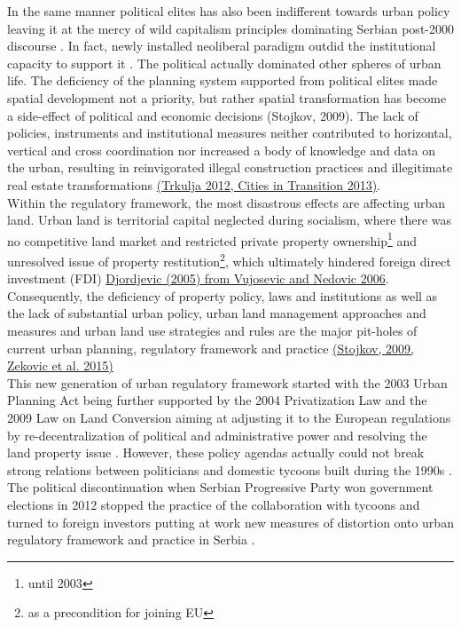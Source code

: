 \documentclass[11pt]{report}
\begin{document}
In the same manner political elites has also been indifferent towards urban policy leaving it at the mercy of wild capitalism principles dominating Serbian post-2000 discourse \href{}{\citealt{vujovic_belgrades_2007}}.
In fact, newly installed neoliberal paradigm outdid the institutional capacity to support it \cite{Peric 2016}.
The political actually dominated other spheres of urban life. The deficiency of the planning system supported from political elites made spatial development not a priority, but rather spatial transformation has become a side-effect of political and economic decisions (Stojkov, 2009). 
The lack of policies, instruments and institutional measures neither contributed to horizontal, vertical and cross coordination nor increased a body of knowledge and data on the urban, resulting in reinvigorated illegal construction practices and illegitimate real estate transformations \href{}{(Trkulja 2012, Cities in Transition 2013)}.
\\

Within the regulatory framework, the most disastrous effects are affecting urban land. Urban land is territorial capital neglected during socialism, where there was no competitive land market and restricted private property ownership\footnote{until 2003} and unresolved issue of property restitution\footnote{as a precondition for joining EU}, which ultimately hindered foreign direct investment (FDI) \href{}{Djordjevic (2005) from Vujosevic and Nedovic 2006}.  
Consequently, the deficiency of property policy, laws and institutions as well as the lack of substantial urban policy, urban land management approaches and measures and urban land use strategies and rules are the major pit-holes of current urban planning, regulatory framework and practice \href{}{(Stojkov, 2009, Zekovic et al. 2015)} 
\\

This new generation of urban regulatory framework started with the 2003 Urban Planning Act being further supported by the 2004 Privatization Law and the 2009 Law on Land Conversion aiming at adjusting it to the European regulations by re-decentralization of political and administrative power and resolving the land property issue \cite{Cagic 2014}. However, these policy agendas actually could not break strong relations between politicians and domestic tycoons built during the 1990s \href{}{\citealt{peric_evolution_2016}}.
The political discontinuation when Serbian Progressive Party won government elections in 2012 stopped the practice of the collaboration with tycoons and turned to foreign investors putting at work new measures of distortion onto urban regulatory framework and practice in Serbia \cite{ibid.}.
            
\end{document}
